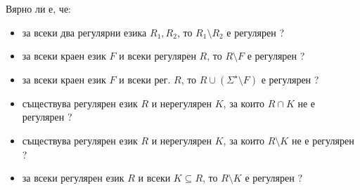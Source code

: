 Вярно ли е, че:
\begin{itemize}
\item
  за всеки два регулярни езика $R_1, R_2$, то $R_1 \setminus R_2$ е регулярен ?
\item
  за всеки краен език $F$ и всеки регулярен $R$, то $R\setminus F$ е регулярен ?
\item
  за всеки краен език $F$ и всеки рег. $R$, то $R\cup (\Sigma^\star \setminus F)$ е регулярен ?
\item
  съществува регулярен език $R$ и нерегулярен $K$, за които $R\cap K$ не е регулярен ?
\item
  съществува регулярен език $R$ и нерегулярен $K$, за които $R\setminus K$ не е регулярен ?
\item
  за всеки регулярен език $R$ и всеки $K \subseteq R$, то $R\setminus K$ е регулярен ?
\end{itemize}





